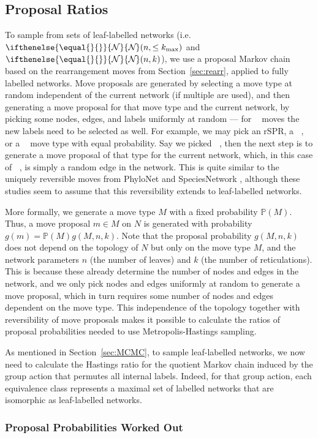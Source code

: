\documentclass{article}
\theoremstyle{definition}
\newcommand{\N}[1][]{
\ifthenelse{\equal{#1}{}}{\mathcal{N}}{\mathcal{N}_{#1}}%
}
\newcommand{\PP}{\mathbb{P}}
\DeclareMathOperator{\VM}{Vert^{--}}
\DeclareMathOperator{\VP}{Vert^+}
\newcommand{\rSPR}{\mathrm{rSPR}}
\begin{document}
\subsection{Proposal Ratios}
To sample from sets of leaf-labelled networks (i.e. $\N(n,\leq k_{\mathrm{max}})$ and $\N(n, k)$), we use a proposal Markov chain based on the rearrangement moves from Section~\ref{sec:rearr}, applied to fully labelled networks. Move proposals are generated by selecting a move type at random independent of the current network (if multiple are used), and then generating a move proposal for that move type and the current network, by picking some nodes, edges, and labels uniformly at random --- for $\VP$ moves the new labels need to be selected as well. For example, we may pick an $\rSPR$, a $\VM$, or a $\VP$ move type with equal probability. Say we picked $\VM$, then the next step is to generate a move proposal of that type for the current network, which, in this case of $\VM$, is simply a random edge in the network. This is quite similar to the uniquely reversible moves from PhyloNet \cite{wen2016bayesian} and SpeciesNetwork \cite{zhang2018bayesian}, although these studies seem to assume that this reversibility extends to leaf-labelled networks.

More formally, we generate a move type $M$ with a fixed probability $\PP(M)$. Thus, a move proposal $m\in M$ on $N$ is generated with probability $g(m)=\PP(M) g(M,n,k)$. Note that the proposal probability $g(M,n,k)$ does not depend on the topology of $N$ but only on the move type $M$, and the network parameters $n$ (the number of leaves) and $k$ (the number of reticulations). This is because these already determine the number of nodes and edges in the network, and we only pick nodes and edges uniformly at random to generate a move proposal, which in turn requires some number of nodes and edges dependent on the move type. This independence of the topology together with reversibility of move proposals makes it possible to calculate the ratios of proposal probabilities needed to use Metropolis-Hastings sampling. 

As mentioned in Section~\ref{sec:MCMC}, to sample leaf-labelled networks, we now need to calculate the Hastings ratio for the quotient Markov chain induced by the group action that permutes all internal labels. Indeed, for that group action, each equivalence class represents a maximal set of labelled networks that are isomorphic as leaf-labelled networks. 

\subsubsection{Proposal Probabilities Worked Out}\label{sec:proposal_probabilities_worked_out}
\end{document}
